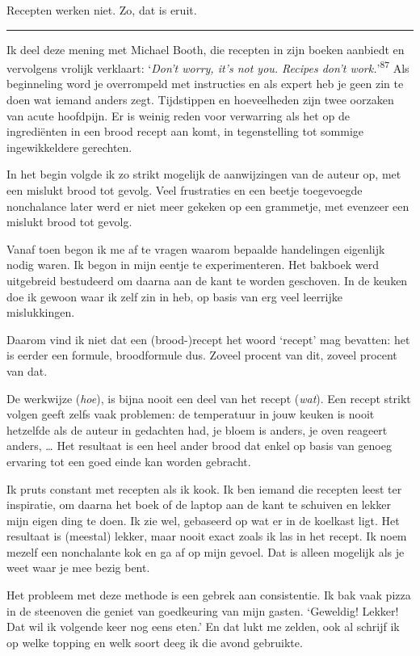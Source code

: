 \documentclass[
  11pt,
  dutch,
]{memoir}
\begin{document}
Recepten werken niet. Zo, dat is eruit.

\pfbreak

Ik deel deze mening met Michael Booth, die recepten in zijn boeken
aanbiedt en vervolgens vrolijk verklaart: `\emph{Don't worry, it's not
you. Recipes don't work.}'\textsuperscript{87} Als beginneling word je
overrompeld met instructies en als expert heb je geen zin te doen wat
iemand anders zegt. Tijdstippen en hoeveelheden zijn twee oorzaken van
acute hoofdpijn. Er is weinig reden voor verwarring als het op de
ingrediënten in een brood recept aan komt, in tegenstelling tot sommige
ingewikkeldere gerechten.

In het begin volgde ik zo strikt mogelijk de aanwijzingen van de auteur
op, met een mislukt brood tot gevolg. Veel frustraties en een beetje
toegevoegde nonchalance later werd er niet meer gekeken op een
grammetje, met evenzeer een mislukt brood tot gevolg.

Vanaf toen begon ik me af te vragen waarom bepaalde handelingen
eigenlijk nodig waren. Ik begon in mijn eentje te experimenteren. Het
bakboek werd uitgebreid bestudeerd om daarna aan de kant te worden
geschoven. In de keuken doe ik gewoon waar ik zelf zin in heb, op basis
van erg veel leerrijke mislukkingen.

Daarom vind ik niet dat een (brood-)recept het woord `recept' mag
bevatten: het is eerder een formule, broodformule dus. Zoveel procent
van dit, zoveel procent van dat.

De werkwijze (\emph{hoe}), is bijna nooit een deel van het recept
(\emph{wat}). Een recept strikt volgen geeft zelfs vaak problemen: de
temperatuur in jouw keuken is nooit hetzelfde als de auteur in gedachten
had, je bloem is anders, je oven reageert anders, \ldots{} Het resultaat
is een heel ander brood dat enkel op basis van genoeg ervaring tot een
goed einde kan worden gebracht.

Ik pruts constant met recepten als ik kook. Ik ben iemand die recepten
leest ter inspiratie, om daarna het boek of de laptop aan de kant te
schuiven en lekker mijn eigen ding te doen. Ik zie wel, gebaseerd op wat
er in de koelkast ligt. Het resultaat is (meestal) lekker, maar nooit
exact zoals ik las in het recept. Ik noem mezelf een nonchalante kok en
ga af op mijn gevoel. Dat is alleen mogelijk als je weet waar je mee
bezig bent.

Het probleem met deze methode is een gebrek aan consistentie. Ik bak
vaak pizza in de steenoven die geniet van goedkeuring van mijn gasten.
`Geweldig! Lekker! Dat wil ik volgende keer nog eens eten.' En dat lukt
me zelden, ook al schrijf ik op welke topping en welk soort deeg ik die
avond gebruikte.
\end{document}
